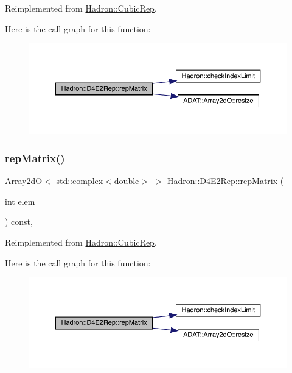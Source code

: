 Reimplemented from \mbox{\hyperlink{structHadron_1_1CubicRep_ac5d7e9e6f4ab1158b5fce3e4ad9e8005}{Hadron\+::\+Cubic\+Rep}}.

Here is the call graph for this function\+:
\nopagebreak
\begin{figure}[H]
\begin{center}
\leavevmode
\includegraphics[width=350pt]{d5/da6/structHadron_1_1D4E2Rep_ae07926c0c41e03ed930683eb4e9be5f5_cgraph}
\end{center}
\end{figure}
\mbox{\label{structHadron_1_1D4E2Rep_ae07926c0c41e03ed930683eb4e9be5f5}} 
\subsubsection{\texorpdfstring{repMatrix()}{repMatrix()}\hspace{0.1cm}{\footnotesize\ttfamily [3/3]}}
{\footnotesize\ttfamily \mbox{\hyperlink{classADAT_1_1Array2dO}{Array2dO}}$<$ std\+::complex$<$double$>$ $>$ Hadron\+::\+D4\+E2\+Rep\+::rep\+Matrix (\begin{DoxyParamCaption}\item[{int}]{elem }\end{DoxyParamCaption}) const\hspace{0.3cm}{\ttfamily [inline]}, {\ttfamily [virtual]}}



Reimplemented from \mbox{\hyperlink{structHadron_1_1CubicRep_ac5d7e9e6f4ab1158b5fce3e4ad9e8005}{Hadron\+::\+Cubic\+Rep}}.

Here is the call graph for this function\+:
\nopagebreak
\begin{figure}[H]
\begin{center}
\leavevmode
\includegraphics[width=350pt]{d5/da6/structHadron_1_1D4E2Rep_ae07926c0c41e03ed930683eb4e9be5f5_cgraph}
\end{center}
\end{figure}


